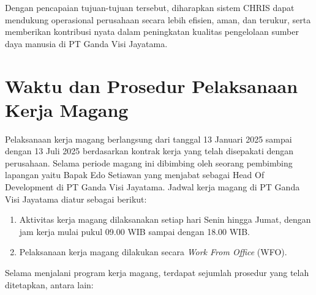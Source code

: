 Dengan pencapaian tujuan-tujuan tersebut, diharapkan sistem CHRIS dapat mendukung operasional perusahaan secara lebih efisien, aman, dan terukur, serta memberikan kontribusi nyata dalam peningkatan kualitas pengelolaan sumber daya manusia di PT Ganda Visi Jayatama.






\section{Waktu dan Prosedur Pelaksanaan Kerja Magang}

Pelaksanaan kerja magang berlangsung dari tanggal 13 Januari 2025 sampai dengan 
13 Juli 2025 berdasarkan kontrak kerja yang telah disepakati dengan perusahaan. Selama periode magang ini dibimbing oleh seorang pembimbing lapangan yaitu Bapak Edo Setiawan yang menjabat sebagai Head Of Development di PT Ganda Visi Jayatama. Jadwal kerja magang di PT Ganda Visi Jayatama diatur sebagai berikut:

\begin{enumerate}
    \item Aktivitas kerja magang dilaksanakan setiap hari Senin hingga Jumat, 
    dengan jam kerja mulai pukul 09.00 WIB sampai dengan 18.00 WIB.
    \item Pelaksanaan kerja magang dilakukan secara \textit{Work From Office} (WFO).
\end{enumerate}

Selama menjalani program kerja magang, terdapat sejumlah prosedur yang telah ditetapkan, antara lain:

